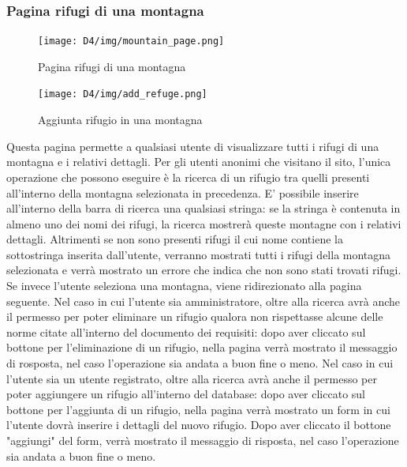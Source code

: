 \documentclass[a4paper,12pt]{article}
\begin{document}
\subsubsection{Pagina rifugi di una montagna}
\begin{figure}[H]
    \centering
    \texttt{[image: D4/img/mountain\_page.png]}
    \caption{Pagina rifugi di una montagna}
\end{figure}
\begin{figure}[H]
    \centering
    \texttt{[image: D4/img/add\_refuge.png]}
    \caption{Aggiunta rifugio in una montagna}
\end{figure}
Questa pagina permette a qualsiasi utente di visualizzare tutti i rifugi di una montagna e i relativi dettagli.\newline
Per gli utenti anonimi che visitano il sito, l'unica operazione che possono eseguire è la ricerca di un rifugio tra quelli presenti all'interno della montagna selezionata in precedenza. \newline
E' possibile inserire all'interno della barra di ricerca una qualsiasi stringa: se la stringa è contenuta in almeno uno dei nomi dei rifugi, la ricerca mostrerà queste montagne con i relativi dettagli. \newline
Altrimenti se non sono presenti rifugi il cui nome contiene la sottostringa inserita dall'utente, verranno mostrati tutti i rifugi della montagna selezionata e verrà mostrato un errore che indica che non sono stati trovati rifugi. \newline
Se invece l'utente seleziona una montagna, viene ridirezionato alla pagina seguente. \newline
Nel caso in cui l'utente sia amministratore, oltre alla ricerca avrà anche il permesso per poter eliminare un rifugio qualora non rispettasse alcune delle norme citate all'interno del documento dei requisiti: dopo aver cliccato sul bottone per l'eliminazione di un rifugio, nella pagina verrà mostrato il messaggio di rosposta, nel caso l'operazione sia andata a buon fine o meno. \newline
Nel caso in cui l'utente sia un utente registrato, oltre alla ricerca avrà anche il permesso per poter aggiungere un rifugio all'interno del database: dopo aver cliccato sul bottone per l'aggiunta di un rifugio, nella pagina verrà mostrato un form in cui l'utente dovrà inserire i dettagli del nuovo rifugio. \newline
Dopo  aver cliccato il bottone "aggiungi" del form, verrà mostrato il messaggio di risposta, nel caso l'operazione sia andata a buon fine o meno.
\end{document}
